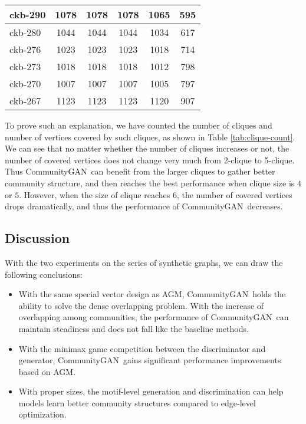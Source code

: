 \documentclass[sigconf]{acmart}
\newcommand{\ComGAN}{CommunityGAN}
\begin{document}
\begin{table}[tbp]
\begin{tabular}{cccccc}
\multicolumn{1}{|l|}{ckb-290} & \multicolumn{1}{c|}{1078} & \multicolumn{1}{c|}{1078} & \multicolumn{1}{c|}{1078} & \multicolumn{1}{c|}{1065} & \multicolumn{1}{c|}{595} \\ \hline
\multicolumn{1}{|l|}{ckb-280} & \multicolumn{1}{c|}{1044} & \multicolumn{1}{c|}{1044} & \multicolumn{1}{c|}{1044} & \multicolumn{1}{c|}{1034} & \multicolumn{1}{c|}{617} \\ \hline
\multicolumn{1}{|l|}{ckb-276} & \multicolumn{1}{c|}{1023} & \multicolumn{1}{c|}{1023} & \multicolumn{1}{c|}{1023} & \multicolumn{1}{c|}{1018} & \multicolumn{1}{c|}{714} \\ \hline
\multicolumn{1}{|l|}{ckb-273} & \multicolumn{1}{c|}{1018} & \multicolumn{1}{c|}{1018} & \multicolumn{1}{c|}{1018} & \multicolumn{1}{c|}{1012} & \multicolumn{1}{c|}{798} \\ \hline
\multicolumn{1}{|l|}{ckb-270} & \multicolumn{1}{c|}{1007} & \multicolumn{1}{c|}{1007} & \multicolumn{1}{c|}{1007} & \multicolumn{1}{c|}{1005} & \multicolumn{1}{c|}{797} \\ \hline
\multicolumn{1}{|l|}{ckb-267} & \multicolumn{1}{c|}{1123} & \multicolumn{1}{c|}{1123} & \multicolumn{1}{c|}{1123} & \multicolumn{1}{c|}{1120} & \multicolumn{1}{c|}{907} \\ \hline
\end{tabular}
\end{table}

To prove such an explanation, we have counted the number of cliques and number of vertices covered by such cliques, as shown in Table \ref{tab:clique-count}.
We can see that no matter whether the number of cliques increases or not, the number of covered vertices does not change very much from 2-clique to 5-clique.
Thus \ComGAN~can benefit from the larger cliques to gather better community structure, and then reaches the best performance when clique size is $4$ or $5$.
However, when the size of clique reaches 6, the number of covered vertices drops dramatically, and thus the performance of \ComGAN~decreases.

\subsection{Discussion}

With the two experiments on the series of synthetic graphs, we can draw the following conclusions:
\begin{itemize}
  \item With the same special vector design as AGM, \ComGAN~holds the ability to solve the dense overlapping problem. With the increase of overlapping among communities, the performance of \ComGAN~can maintain steadiness and does not fall like the baseline methods.
  \item With the minimax game competition between the discriminator and generator, \ComGAN~gains significant performance improvements based on AGM.
  \item With proper sizes, the motif-level generation and discrimination can help models learn better community structures compared to edge-level optimization.
\end{itemize}
\end{document}
